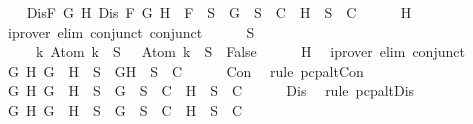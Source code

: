 \begin{isabellebody}
\ \ \isamarkupfalse%
\ Dis{\isacharcolon}{\isachardoublequoteopen}{\isasymforall}F\ G\ H{\isachardot}\ Dis\ F\ G\ H\ {\isasymlongrightarrow}\ F\ {\isasymin}\ S\ {\isasymlongrightarrow}\ {\isacharbraceleft}G{\isacharbraceright}\ {\isasymunion}\ S\ {\isasymin}\ C\ {\isasymor}\ {\isacharbraceleft}H{\isacharbraceright}\ {\isasymunion}\ S\ {\isasymin}\ C{\isachardoublequoteclose}\isanewline
\ \ \ \ \isamarkupfalse%
\ H\ \isamarkupfalse%
\ {\isacharparenleft}iprover\ elim{\isacharcolon}\ conjunct{}\ conjunct{}{\isacharparenright}\isanewline
\ \ \isamarkupfalse%
\ {}{\isacharcolon}{\isachardoublequoteopen}{\isasymbottom}\ {\isasymnotin}\ S\isanewline
\ \ \ \ {\isasymand}\ {\isacharparenleft}{\isasymforall}k{\isachardot}\ Atom\ k\ {\isasymin}\ S\ {\isasymlongrightarrow}\ \isactrlbold {\isasymnot}\ {\isacharparenleft}Atom\ k{\isacharparenright}\ {\isasymin}\ S\ {\isasymlongrightarrow}\ False{\isacharparenright}{\isachardoublequoteclose}\isanewline
\ \ \ \ \isamarkupfalse%
\ H\ \isamarkupfalse%
\ {\isacharparenleft}iprover\ elim{\isacharcolon}\ conjunct{}{\isacharparenright}\isanewline
\ \ \isamarkupfalse%
\ {}{\isacharcolon}{\isachardoublequoteopen}{\isasymforall}G\ H{\isachardot}\ G\ \isactrlbold {\isasymand}\ H\ {\isasymin}\ S\ {\isasymlongrightarrow}\ {\isacharbraceleft}G{\isacharcomma}H{\isacharbraceright}\ {\isasymunion}\ S\ {\isasymin}\ C{\isachardoublequoteclose}\isanewline
\ \ \ \ \isamarkupfalse%
\ Con\ \isamarkupfalse%
\ {\isacharparenleft}rule\ pcp{\isacharunderscore}alt{}Con{}{\isacharparenright}\isanewline
\ \ \isamarkupfalse%
\ {}{\isacharcolon}{\isachardoublequoteopen}{\isasymforall}G\ H{\isachardot}\ G\ \isactrlbold {\isasymor}\ H\ {\isasymin}\ S\ {\isasymlongrightarrow}\ {\isacharbraceleft}G{\isacharbraceright}\ {\isasymunion}\ S\ {\isasymin}\ C\ {\isasymor}\ {\isacharbraceleft}H{\isacharbraceright}\ {\isasymunion}\ S\ {\isasymin}\ C{\isachardoublequoteclose}\isanewline
\ \ \ \ \isamarkupfalse%
\ Dis\ \isamarkupfalse%
\ {\isacharparenleft}rule\ pcp{\isacharunderscore}alt{}Dis{}{\isacharparenright}\isanewline
\ \ \isamarkupfalse%
\ {}{\isacharcolon}{\isachardoublequoteopen}{\isasymforall}G\ H{\isachardot}\ G\ \isactrlbold {\isasymrightarrow}\ H\ {\isasymin}\ S\ {\isasymlongrightarrow}\ {\isacharbraceleft}\isactrlbold {\isasymnot}G{\isacharbraceright}\ {\isasymunion}\ S\ {\isasymin}\ C\ {\isasymor}\ {\isacharbraceleft}H{\isacharbraceright}\ {\isasymunion}\ S\ {\isasymin}\ C{\isachardoublequoteclose}\isanewline

\end{isabellebody}
